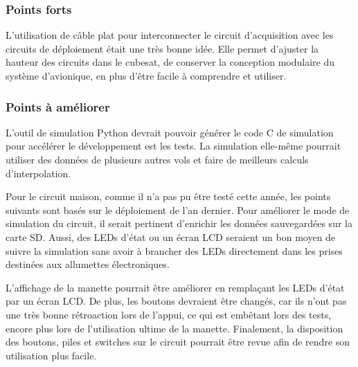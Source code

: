 \subsubsection{Points forts}

L'utilisation de câble plat pour interconnecter le circuit d'acquisition avec
les circuits de déploiement était une très bonne idée. Elle permet d'ajuster la
hauteur des circuits dans le cubesat, de conserver la conception modulaire du
système d'avionique, en plus d'être facile à comprendre et utiliser.

\subsubsection{Points à améliorer}


L'outil de simulation Python devrait pouvoir générer le code C de simulation
pour accélérer le développement est les tests. La simulation elle-même pourrait
utiliser des données de plusieurs autres vols et faire de meilleurs calculs
d'interpolation.
\\
\par
Pour le circuit maison, comme il n'a pas pu être testé cette année, les points
suivants sont basés sur le déploiement de l'an dernier. Pour améliorer le mode
de simulation du circuit, il serait pertinent d'enrichir les données
sauvegardées sur la carte SD. Aussi, des LEDs d'état ou un écran LCD seraient
un bon moyen de suivre la simulation sans avoir à brancher des LEDs directement
dans les prises destinées aux allumettes électroniques.


L'affichage de la manette pourrait être améliorer en remplaçant les LEDs d'état
par un écran LCD. De plus, les boutons devraient être changés, car ils n'ont
pas une très bonne rétroaction lors de l'appui, ce qui est embêtant lors des
tests, encore plus lors de l'utilisation ultime de la manette. Finalement, la
disposition des boutons, piles et switches sur le circuit pourrait être revue
afin de rendre son utilisation plus facile.
